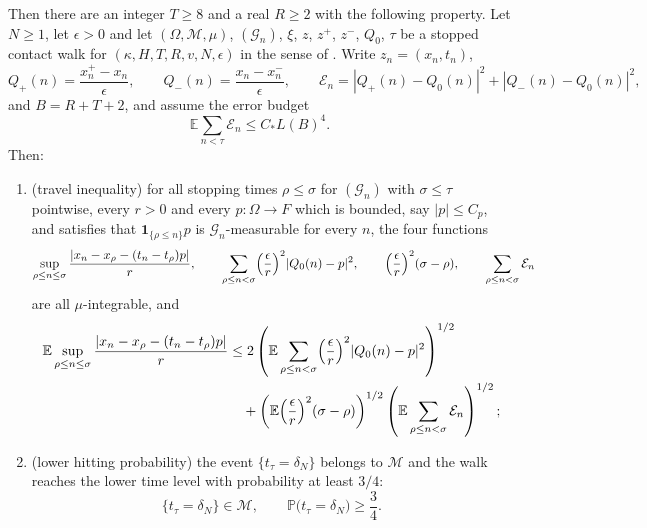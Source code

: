 \begin{lemma}
Then there are an integer $T\ge8$ and a real $R\ge2$ with the following
property. Let $N\ge1$, let $\epsilon>0$ and let
$(\Omega,\mathcal M,\mu)$, $(\mathcal G_n)$, $\xi$, $z$, $z^+$, $z^-$, $Q_0$,
$\tau$ be a stopped contact walk for $(\kappa,H,T,R,v,N,\epsilon)$ in the sense
of . Write $z_n=(x_n,t_n)$,
\[
  Q_+(n)=\frac{x^+_n-x_n}{\epsilon},\qquad
  Q_-(n)=\frac{x_n-x^-_n}{\epsilon},\qquad
  \mathcal E_n=|Q_+(n)-Q_0(n)|^2+|Q_-(n)-Q_0(n)|^2,
\]
and $B=R+T+2$, and assume the error budget
\begin{equation}\label{eq:contact-error-budget-hyp}
  \mathbb E\sum_{n<\tau}\mathcal E_n\le C_*L(B)^4 .
\end{equation}
Then:
\begin{enumerate}
\item[(i)] (travel inequality) for all stopping times $\rho\le\sigma$ for
$(\mathcal G_n)$ with $\sigma\le\tau$ pointwise, every $r>0$ and every
$p:\Omega\to F$ which is bounded, say $|p|\le C_p$, and satisfies that
$\mathbf1_{\{\rho\le n\}}p$ is $\mathcal G_n$-measurable for every $n$, the four
functions
\[
  \sup_{\rho\le n\le\sigma}\frac{|x_n-x_\rho-(t_n-t_\rho)p|}{r},\qquad
  \sum_{\rho\le n<\sigma}\Bigl(\frac{\epsilon}{r}\Bigr)^2|Q_0(n)-p|^2,\qquad
  \Bigl(\frac{\epsilon}{r}\Bigr)^2(\sigma-\rho),\qquad
  \sum_{\rho\le n<\sigma}\mathcal E_n
\]
are all $\mu$-integrable, and
\begin{equation}\label{eq:contact-travel-inequality}
\begin{split}
  \mathbb E\sup_{\rho\le n\le\sigma}
     \frac{|x_n-x_\rho-(t_n-t_\rho)p|}{r}
  &\le 2\left(\mathbb E\sum_{\rho\le n<\sigma}
        \Bigl(\frac{\epsilon}{r}\Bigr)^2|Q_0(n)-p|^2\right)^{1/2}\\
  &\quad+\left(\mathbb E\Bigl(\frac{\epsilon}{r}\Bigr)^2(\sigma-\rho)\right)^{1/2}
     \left(\mathbb E\sum_{\rho\le n<\sigma}\mathcal E_n\right)^{1/2};
\end{split}
\end{equation}
\item[(ii)] (lower hitting probability) the event $\{t_\tau=\delta_N\}$ belongs
to $\mathcal M$ and the walk reaches the lower time level with probability at
least $3/4$:
\begin{equation}\label{eq:contact-lower-hit-probability}
  \{t_\tau=\delta_N\}\in\mathcal M,\qquad
  \mathbb P\bigl(t_\tau=\delta_N\bigr)\ge\frac34 .
\end{equation}
\end{enumerate}
\end{lemma}
